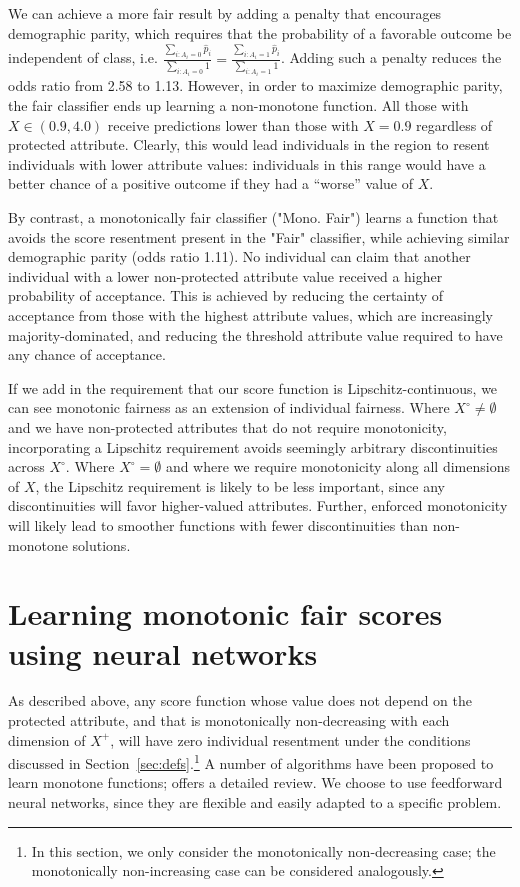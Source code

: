     We can achieve a more fair result by adding a penalty that encourages demographic parity\cite{HarPriSre2016}, which requires that the probability of a favorable outcome be independent of class, i.e. 
     $\frac{\sum_{i: A_i = 0} \hat{p}_i}{\sum_{i: A_i = 0} 1} = \frac{\sum_{i: A_i = 1} \hat{p}_i}{\sum_{i: A_i = 1} 1}$.  Adding such a penalty reduces the odds ratio from 2.58 to 1.13.
    However, in order to maximize demographic parity, the fair classifier ends up learning a non-monotone function. All those with $X \in (0.9, 4.0)$ receive predictions lower than those with $X = 0.9$ regardless of protected attribute. Clearly, this would lead individuals in the region to resent individuals with lower attribute values: individuals in this range would have a better chance of a positive outcome if they had a ``worse'' value of $X$.
        
    By contrast, a monotonically fair classifier ("Mono. Fair") learns a function that avoids the score resentment present in the "Fair" classifier, while achieving similar demographic parity (odds ratio 1.11). No individual can claim that another individual with a lower non-protected attribute value received a higher probability of acceptance.  This is achieved by reducing the certainty of acceptance from those with the highest attribute values, which are increasingly majority-dominated, and reducing the threshold attribute value required to have any chance of acceptance. 
    
    If we add in the requirement that our score function is Lipschitz-continuous, we can see monotonic fairness as an extension of individual fairness. Where $X^\circ \neq \emptyset$ and we have non-protected attributes that do not require monotonicity, incorporating a Lipschitz requirement avoids seemingly arbitrary discontinuities across $X^\circ$. Where $X^\circ = \emptyset$ and where we require monotonicity along all dimensions of $X$, the Lipschitz requirement is likely to be less important, since any discontinuities will favor higher-valued attributes. Further, enforced monotonicity will likely lead to smoother functions with fewer discontinuities than non-monotone solutions.
    
\section{Learning monotonic fair scores using neural networks}

    As described above, any score function whose value does not depend on the protected attribute, and that is monotonically non-decreasing with each dimension of $X^+$, will have zero individual resentment under the conditions discussed in Section~\ref{sec:defs}.\footnote{In this section, we only consider the monotonically non-decreasing case; the monotonically non-increasing case can be considered analogously.} A number of algorithms have been proposed to learn monotone functions; \cite{cano2019monotonic} offers a detailed review. We choose to use feedforward neural networks, since they are flexible and easily adapted to a specific problem.
    
